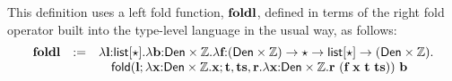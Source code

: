 \documentclass{llncs}
\begin{document}
\noindent
This definition uses a left fold function, ${\textbf{foldl}}$, defined in terms of the right fold operator built into the type-level language in the usual way, as follows:
\[
\begin{array}{rcl}
{\textbf{foldl}} & := & \lambda {\textbf{l}}{:}{\textsf{list}[\star]}.\lambda {\textbf{b}}{:}{\textsf{Den}\times \mathbb{Z}}.\lambda {\textbf{f}}{:}{(\textsf{Den}\times \mathbb{Z})\rightarrow{\star\rightarrow{\textsf{list}[\star]\rightarrow{(\textsf{Den}\times \mathbb{Z})}}}}.\\
& & \quad {\sf fold}({\textbf{l}}; \lambda {\textbf{x}}{:}{\textsf{Den}\times \mathbb{Z}}.{\textbf{x}}; {\textbf{t}},{\textbf{ts}},{\textbf{r}}.\lambda {\textbf{x}}{:}{\textsf{Den}\times \mathbb{Z}}.{\textbf{r}}~({\textbf{f}}~{\textbf{x}}~{\textbf{t}}~{\textbf{ts}}))~{\textbf{b}}
\end{array}
\]
\end{document}
